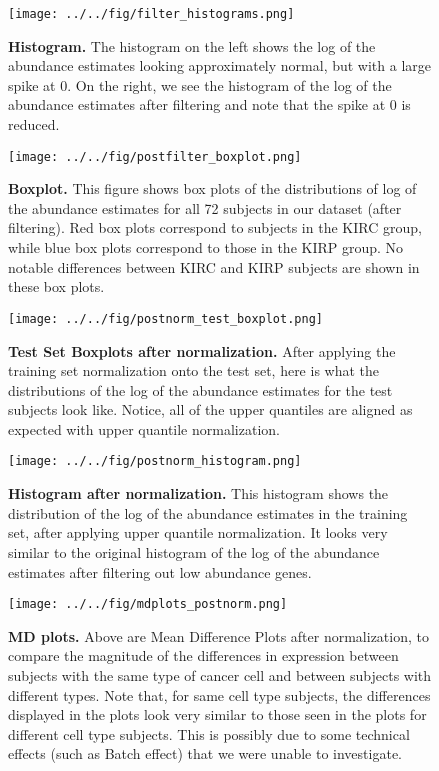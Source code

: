 \begin{figure}[H]
  \centering
    \texttt{[image: ../../fig/filter\_histograms.png]}
\caption{\textbf{Histogram.} The histogram on the left shows the log of the abundance estimates looking
  approximately normal, but with a large spike at 0.  On the right, we see the
  histogram of the log of the abundance estimates after filtering and note that the spike at 0 is
  reduced.}
   \label{fig:histogram}
\end{figure}


\begin{figure}[H]
  \centering
    \texttt{[image: ../../fig/postfilter\_boxplot.png]}
\caption{\textbf{Boxplot.} This figure shows box plots of the distributions of
  log of the abundance estimates for all 72 subjects in our dataset (after filtering). Red 	box
  plots correspond to subjects in the KIRC group, while blue box plots correspond
  to those in the KIRP group. No notable differences between KIRC and KIRP
  subjects are shown in these box plots.}
   \label{fig:boxplot}
\end{figure}


\begin{figure}[H]
  \centering
    \texttt{[image: ../../fig/postnorm\_test\_boxplot.png]}
\caption{\textbf{Test Set Boxplots after normalization.} After applying the training
  set normalization onto the test set, here is what the distributions of the
  log of the abundance estimates for the test subjects look like. Notice, all of the upper quantiles
  are aligned as expected with upper quantile normalization.}
   \label{fig:boxplotpost}
\end{figure}


\begin{figure}[H]
  \centering
    \texttt{[image: ../../fig/postnorm\_histogram.png]}
\caption{\textbf{Histogram after normalization.} This histogram shows the distribution
  of the log of the abundance estimates in the training set, after applying upper quantile
  normalization. It looks very similar to the original histogram of the
  log of the abundance estimates after filtering out low abundance genes.}
   \label{fig:histogram}
\end{figure}

\begin{figure}[H]
  \centering
    \texttt{[image: ../../fig/mdplots\_postnorm.png]}
\caption{\textbf{MD plots.} Above are Mean Difference Plots after normalization, to
  compare the magnitude of the differences in expression between subjects with
  the same type of cancer cell and between subjects with different types.  Note
  that, for same cell type subjects, the differences displayed in the plots look
  very similar to those seen in the plots for different cell type subjects. This
  is possibly due to some technical effects (such as Batch
  effect) that we were unable to investigate.}
   \label{fig:mdplot}
\end{figure}

